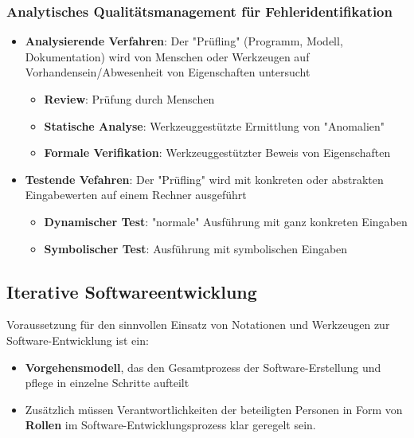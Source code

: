 	\subsubsection{Analytisches Qualitätsmanagement für Fehleridentifikation}
	\begin{itemize}
		\item \textbf{Analysierende Verfahren}: Der "Prüfling" (Programm, Modell, Dokumentation) wird von Menschen oder Werkzeugen auf Vorhandensein/Abwesenheit von Eigenschaften untersucht
		\begin{itemize}
			\item \textbf{Review}: Prüfung durch Menschen
			\item \textbf{Statische Analyse}: Werkzeuggestützte Ermittlung von "Anomalien"
			\item \textbf{Formale Verifikation}: Werkzeuggestützter Beweis von Eigenschaften
		\end{itemize}
		\item \textbf{Testende Vefahren}: Der "Prüfling" wird mit konkreten oder abstrakten Eingabewerten auf einem Rechner ausgeführt
		\begin{itemize}
			\item \textbf{Dynamischer Test}: "normale" Ausführung mit ganz konkreten Eingaben
			\item \textbf{Symbolischer Test}: Ausführung mit symbolischen Eingaben
		\end{itemize}
	\end{itemize}
	\subsection{Iterative Softwareentwicklung}
	Voraussetzung für den sinnvollen Einsatz von Notationen und Werkzeugen zur Software-Entwicklung ist ein:
	\begin{itemize}
		\item \textbf{Vorgehensmodell}, das den Gesamtprozess der Software-Erstellung und pflege in einzelne Schritte aufteilt
		\item Zusätzlich müssen Verantwortlichkeiten der beteiligten Personen in Form von \textbf{Rollen} im Software-Entwicklungsprozess klar geregelt sein.
	\end{itemize}
